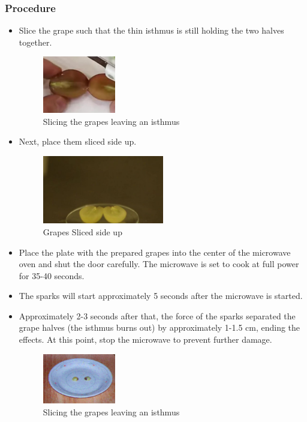 \documentclass{article}
\begin{document}
\subsubsection{\Large Procedure}
\large
\begin{itemize}
    \item Slice the grape such that the thin isthmus is still holding the two halves together.
    \begin{figure}[h]
        \centering
        \includegraphics[width=0.3\textwidth]{Slicing the grapes with isthmus between.jpg}
        \caption{Slicing the grapes leaving an isthmus}
       
    \end{figure}
    \item Next, place them sliced side up.
    \begin{figure}[h]
\centering
\includegraphics[width=0.5\textwidth]{sliced side up.jpg}
\caption{\label{fig:Grapes Sliced } Grapes Sliced side up}
\end{figure}

    \item  \large Place the plate with the prepared grapes into the center of the microwave oven and shut the door carefully. The microwave is set to cook at full power for 35-40 seconds.
    
    \item \large The sparks will start approximately 5 seconds after the microwave is started.
    \item \large Approximately 2-3 seconds after that, the force of the sparks separated the grape halves (the isthmus burns out) by approximately 1-1.5 cm, ending the effects. At this point, stop the microwave to prevent further damage.
    
    \begin{figure}
        \centering
        \includegraphics[width=0.3\textwidth]{After Sparkling.png}
        \caption{Slicing the grapes leaving an isthmus}
        \end{figure}
   
\end{itemize}
\end{document}
